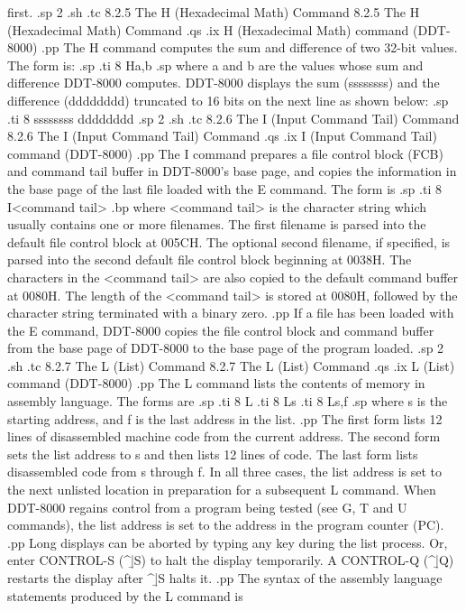 first.
.sp 2
.sh
.tc         8.2.5  The H (Hexadecimal Math) Command
8.2.5  The H (Hexadecimal Math) Command
.qs
.ix H (Hexadecimal Math) command (DDT-8000)
.pp 
The H command computes the sum and difference of two 32-bit values.  The form 
is:
.sp
.ti 8
Ha,b
.sp
where a and b are the values whose sum and difference DDT-8000 computes.
DDT-8000 displays the sum (ssssssss) and the difference (dddddddd) truncated
to 16 bits on the next line as shown below: 
.sp
.ti 8
ssssssss dddddddd
.sp 2
.sh
.tc         8.2.6  The I (Input Command Tail) Command
8.2.6  The I (Input Command Tail) Command
.qs
.ix I (Input Command Tail) command (DDT-8000)
.pp
The I command prepares a file control block (FCB) and command tail 
buffer in DDT-8000's base page, and copies the information in the 
base page of the last file loaded with the E command.  The form 
is
.sp
.ti 8
I<command tail>
.bp
where <command tail> is the character string which usually 
contains one or more filenames.  The first filename is parsed 
into the default file control block at 005CH.  The optional 
second filename, if specified, is parsed into the second 
default file control block beginning at 0038H.  The 
characters in the <command tail> are also copied to the default
command buffer at 0080H.  The length of the <command tail> is 
stored at 0080H, followed by the character string terminated with 
a binary zero. 
.pp
If a file has been loaded with the E command, DDT-8000 copies the 
file control block and command buffer from the base page of 
DDT-8000 to the base page of the program loaded.  
.sp 2
.sh
.tc         8.2.7  The L (List) Command
8.2.7  The L (List) Command
.qs
.ix L (List) command (DDT-8000)
.pp 
The L command lists the contents of
memory in assembly language.  The forms are
.sp
.ti 8
L
.ti 8
Ls
.ti 8
Ls,f
.sp
where s is the starting address, and f is the last address
in the list.
.pp 
The first form lists 12 lines of disassembled machine code from the
current address.  The second form sets the list address to s and then 
lists 12 lines of code.  The last form lists disassembled code from s 
through f.  In all three cases, the list address is set to the next unlisted 
location in preparation for a subsequent L command.  When DDT-8000 regains 
control from a program being tested (see G, T and U commands), the list 
address is set to the address in the program counter (PC).
.pp 
Long displays can be aborted by typing any key during the list process.  Or, 
enter CONTROL-S (^\b|S) to halt the display temporarily.  A 
CONTROL-Q (^\b|Q) restarts the 
display after ^\b|S halts it.
.pp 
The syntax of the assembly language statements produced by the L command is

